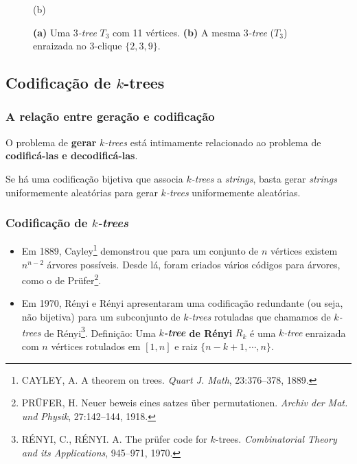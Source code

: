 \documentclass{beamer}
\begin{document}
\begin{frame}
\begin{figure}
\begin{minipage}{0.5\textwidth}
{
        }

        (b)
      \end{minipage}

      \caption{
        \textbf{(a)} Uma \emph{$3$-tree} $T_3$ com 11 vértices.
        \textbf{(b)} A mesma \emph{$3$-tree} ($T_3$) enraizada no $3$-clique $\{2, 3, 9\}$.
      }
      \label{fig:rootedktree}
    \end{figure}
  \end{frame}

  \subsection{Codificação de $k$-trees}

  \begin{frame}
    \frametitle{A relação entre geração e codificação}

    O problema de \textbf{gerar} \emph{$k$-trees} está intimamente relacionado ao problema de \textbf{codificá-las e decodificá-las}.

    \vspace{1em}

    Se há uma codificação bijetiva que associa \emph{$k$-trees} a \emph{strings}, basta gerar \emph{strings} uniformemente aleatórias para gerar \emph{$k$-trees} uniformemente aleatórias.
  \end{frame}

  \begin{frame}
    \frametitle{Codificação de \emph{$k$-trees}}

    \begin{itemize}
      \item Em 1889, Cayley\footnote{\scriptsize CAYLEY, A. A theorem on trees. \emph{Quart J. Math}, 23:376--378, 1889.} demonstrou que para um conjunto de $n$ vértices existem $n^{n-2}$ árvores possíveis. Desde lá, foram criados vários códigos para árvores, como o de Prüfer\footnote{\scriptsize PRÜFER, H. Neuer beweis eines satzes über permutationen. \emph{Archiv der Mat. und Physik}, 27:142--144, 1918.}.
      \item Em 1970, Rényi e Rényi apresentaram uma codificação redundante (ou seja, não bijetiva) para um subconjunto de \emph{$k$-trees} rotuladas que chamamos de \emph{$k$-trees} de Rényi\footnote{\scriptsize RÉNYI, C., RÉNYI. A. The prüfer code for $k$-trees. \emph{Combinatorial Theory and its Applications}, 945--971, 1970.}. Definição: Uma \textbf{\emph{$k$-tree} de Rényi} $R_k$ é uma \emph{$k$-tree} enraizada com $n$ vértices rotulados em $[1, n]$ e raiz $\{n-k+1, \cdots, n\}$.
    \end{itemize}
  \end{frame}
\end{document}
